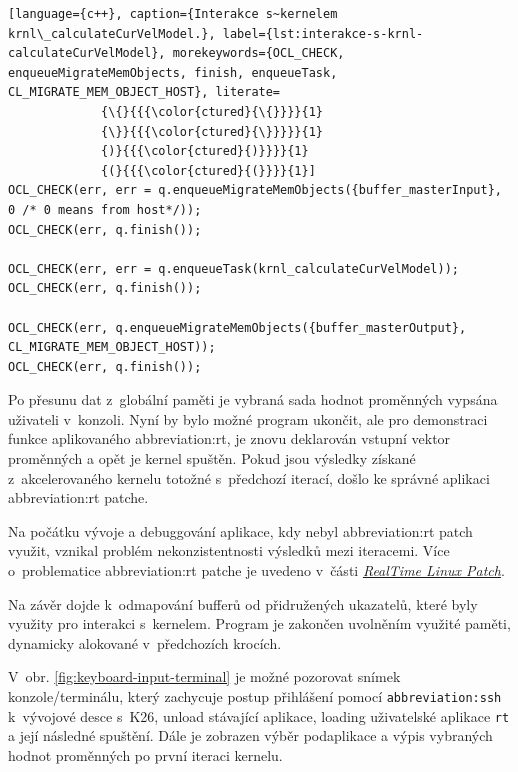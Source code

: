 \documentclass[a4paper, twoside, 11pt]{article}
\begin{document}
		\begin{lstlisting}[language={c++}, caption={Interakce s~kernelem krnl\_calculateCurVelModel.}, label={lst:interakce-s-krnl-calculateCurVelModel}, morekeywords={OCL_CHECK, enqueueMigrateMemObjects, finish, enqueueTask, CL_MIGRATE_MEM_OBJECT_HOST}, literate=
			 {\{}{{{\color{ctured}{\{}}}}{1}
			 {\}}{{{\color{ctured}{\}}}}}{1}
			 {)}{{{\color{ctured}{)}}}}{1}
			 {(}{{{\color{ctured}{(}}}}{1}]
OCL_CHECK(err, err = q.enqueueMigrateMemObjects({buffer_masterInput}, 0 /* 0 means from host*/));
OCL_CHECK(err, q.finish());

OCL_CHECK(err, err = q.enqueueTask(krnl_calculateCurVelModel));
OCL_CHECK(err, q.finish());

OCL_CHECK(err, q.enqueueMigrateMemObjects({buffer_masterOutput}, CL_MIGRATE_MEM_OBJECT_HOST));
OCL_CHECK(err, q.finish());
\end{lstlisting}

	Po přesunu dat z~globální paměti je vybraná sada hodnot proměnných vypsána uživateli v~konzoli. Nyní by bylo možné program ukončit, ale pro demonstraci funkce aplikovaného \gls{abbreviation:rt}, je znovu deklarován vstupní vektor proměnných a opět je kernel spuštěn. Pokud jsou výsledky získané z~akcelerovaného kernelu totožné s~předchozí iterací, došlo ke správné aplikaci \gls{abbreviation:rt} patche.\par
	Na počátku vývoje a debuggování aplikace, kdy nebyl \gls{abbreviation:rt} patch využit, vznikal problém nekonzistentnosti výsledků mezi iteracemi. Více o~problematice \gls{abbreviation:rt} patche je uvedeno v~části \hyperref[subsec:real-time-linux-patch]{\textit{RealTime Linux Patch}}.\par
	Na závěr dojde k~odmapování bufferů od přidružených ukazatelů, které byly využity pro interakci s~kernelem. Program je zakončen uvolněním využité paměti, dynamicky alokované v~předchozích krocích.\par
	V~obr. \ref{fig:keyboard-input-terminal} je možné pozorovat snímek konzole/terminálu, který zachycuje postup přihlášení pomocí \texttt{\gls{abbreviation:ssh}} k~vývojové desce s~K26, unload stávající aplikace, loading uživatelské aplikace \texttt{rt} a její následné spuštění. Dále je zobrazen výběr podaplikace a výpis vybraných hodnot proměnných po první iteraci kernelu.
\end{document}
